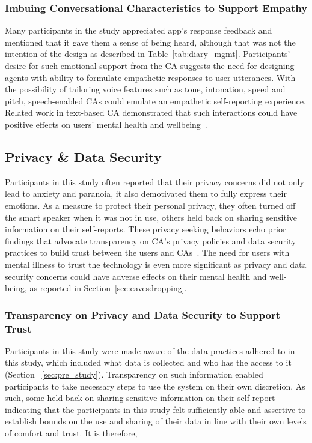         \subsubsection{Imbuing Conversational Characteristics to Support Empathy}

            Many participants in the study appreciated \acl{app}'s response feedback and mentioned that it gave them a sense of being heard, although that was not the intention of the design as described in Table~\ref{tab:diary_mgmt}. Participants' desire for such emotional support from the \ac{CA} suggests the need for designing agents with ability to formulate empathetic responses to user utterances. With the possibility of tailoring voice features such as tone, intonation, speed and pitch, speech-enabled \ac{CA}s could emulate an empathetic self-reporting experience. Related work in text-based \ac{CA} demonstrated that such interactions could have positive effects on users' mental health and wellbeing~\cite{inkster2018empathy}. 
            

    \subsection{Privacy \& Data Security} 
        Participants in this study often reported that their privacy concerns did not only lead to anxiety and paranoia, it also demotivated them to fully express their emotions. As a measure to protect their personal privacy, they often turned off the smart speaker when it was not in use, others held back on sharing sensitive information on their self-reports. These privacy seeking behaviors echo prior findings that advocate transparency on \ac{CA}'s privacy policies and data security practices to build trust between the users and \ac{CA}s~\cite{lau2018alexa, pradhan2018accessibility}. The need for users with mental illness to trust the technology is even more significant as privacy and data security concerns could have adverse effects on their mental health and well-being, as reported in Section~\ref{sec:eavesdropping}. 
        
        \subsubsection{Transparency on Privacy and Data Security to Support Trust}

            Participants in this study were made aware of the data practices adhered to in this study, which included what data is collected and who has the access to it (Section ~\ref{sec:pre_study}). Transparency on such information enabled participants to take necessary steps to use the system on their own discretion. As such, some held back on sharing sensitive information on their self-report indicating that the participants in this study felt sufficiently able and assertive to establish bounds on the use and sharing of their data in line with their own levels of comfort and trust. It is therefore, 
            
            
            
